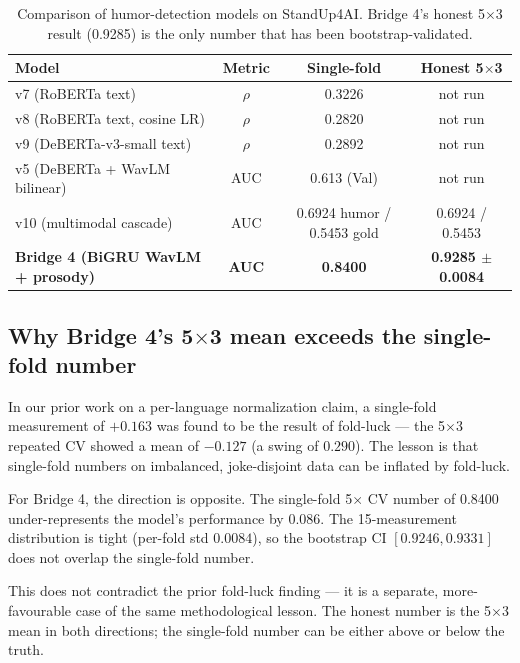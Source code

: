 \documentclass[11pt, letterpaper]{article}
\begin{document}
\begin{table}[h]
\centering
\begin{tabular}{lccc}
\toprule
\textbf{Model} & \textbf{Metric} & \textbf{Single-fold} & \textbf{Honest 5$\times$3} \\
\midrule
v7 (RoBERTa text) & $\rho$ & 0.3226 & not run \\
v8 (RoBERTa text, cosine LR) & $\rho$ & 0.2820 & not run \\
v9 (DeBERTa-v3-small text) & $\rho$ & 0.2892 & not run \\
\midrule
v5 (DeBERTa + WavLM bilinear) & AUC & 0.613 (Val) & not run \\
v10 (multimodal cascade) & AUC & 0.6924 humor / 0.5453 gold & 0.6924 / 0.5453 \\
\midrule
\textbf{Bridge 4 (BiGRU WavLM + prosody)} & \textbf{AUC} & \textbf{0.8400} & \textbf{0.9285 $\pm$ 0.0084} \\
\bottomrule
\end{tabular}
\caption{Comparison of humor-detection models on StandUp4AI. Bridge 4's honest 5$\times$3 result (0.9285) is the only number that has been bootstrap-validated.}
\label{tab:compare}
\end{table}

\subsection{Why Bridge 4's 5$\times$3 mean exceeds the single-fold number}

In our prior work on a per-language normalization claim, a single-fold measurement of $+0.163$ was found to be the result of fold-luck --- the 5$\times$3 repeated CV showed a mean of $-0.127$ (a swing of $0.290$). The lesson is that single-fold numbers on imbalanced, joke-disjoint data can be inflated by fold-luck.

For Bridge 4, the direction is opposite. The single-fold 5$\times$ CV number of 0.8400 under-represents the model's performance by $0.086$. The 15-measurement distribution is tight (per-fold std $0.0084$), so the bootstrap CI $[0.9246, 0.9331]$ does not overlap the single-fold number.

This does not contradict the prior fold-luck finding --- it is a separate, more-favourable case of the same methodological lesson. The honest number is the 5$\times$3 mean in both directions; the single-fold number can be either above or below the truth.

\end{document}
